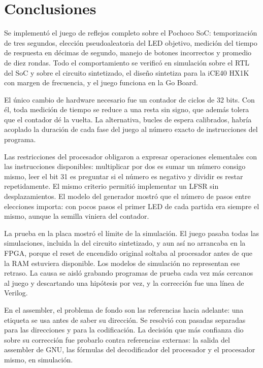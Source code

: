 \section{Conclusiones}

Se implementó el juego de reflejos completo sobre el Pochoco SoC: temporización de tres
segundos, elección pseudoaleatoria del LED objetivo, medición del tiempo de respuesta
en décimas de segundo, manejo de botones incorrectos y promedio de diez rondas. Todo
el comportamiento se verificó en simulación sobre el RTL del SoC y sobre el circuito
sintetizado, el diseño sintetiza para la iCE40 HX1K con margen de frecuencia, y el juego
funciona en la Go Board.

El único cambio de hardware necesario fue un contador de ciclos de 32 bits. Con él, toda
medición de tiempo se reduce a una resta sin signo, que además tolera que el contador
dé la vuelta. La alternativa, bucles de espera calibrados, habría acoplado la duración
de cada fase del juego al número exacto de instrucciones del programa.

Las restricciones del procesador obligaron a expresar operaciones elementales con las
instrucciones disponibles: multiplicar por dos es sumar un número consigo mismo, leer
el bit 31 es preguntar si el número es negativo y dividir es restar repetidamente. El
mismo criterio permitió implementar un LFSR sin desplazamientos. El modelo del
generador mostró que el número de pasos entre elecciones importa: con pocos pasos el
primer LED de cada partida era siempre el mismo, aunque la semilla viniera del
contador.

La prueba en la placa mostró el límite de la simulación. El juego pasaba todas las
simulaciones, incluida la del circuito sintetizado, y aun así no arrancaba en la FPGA,
porque el reset de encendido original soltaba al procesador antes de que la RAM
estuviera disponible. Los modelos de simulación no representan ese retraso. La causa
se aisló grabando programas de prueba cada vez más cercanos al juego y descartando una
hipótesis por vez, y la corrección fue una línea de Verilog.

En el assembler, el problema de fondo son las referencias hacia adelante: una etiqueta
se usa antes de saber su dirección. Se resolvió con pasadas separadas para las
direcciones y para la codificación. La decisión que más confianza dio sobre su
corrección fue probarlo contra referencias externas: la salida del assembler de GNU,
las fórmulas del decodificador del procesador y el procesador mismo, en simulación.
